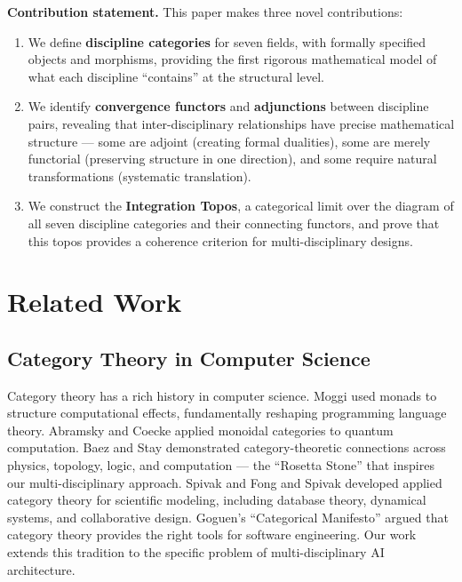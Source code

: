 \documentclass[11pt,a4paper]{article}
\begin{document}
\textbf{Contribution statement.} This paper makes three novel contributions:
\begin{enumerate}[label=\arabic*.]
    \item We define \textbf{discipline categories} for seven fields, with formally specified objects and morphisms, providing the first rigorous mathematical model of what each discipline ``contains'' at the structural level.
    \item We identify \textbf{convergence functors} and \textbf{adjunctions} between discipline pairs, revealing that inter-disciplinary relationships have precise mathematical structure --- some are adjoint (creating formal dualities), some are merely functorial (preserving structure in one direction), and some require natural transformations (systematic translation).
    \item We construct the \textbf{Integration Topos}, a categorical limit over the diagram of all seven discipline categories and their connecting functors, and prove that this topos provides a coherence criterion for multi-disciplinary designs.
\end{enumerate}

\section{Related Work}

\subsection{Category Theory in Computer Science}

Category theory has a rich history in computer science. Moggi \cite{moggi1991} used monads to structure computational effects, fundamentally reshaping programming language theory. Abramsky and Coecke \cite{abramsky2004} applied monoidal categories to quantum computation. Baez and Stay \cite{baez2011} demonstrated category-theoretic connections across physics, topology, logic, and computation --- the ``Rosetta Stone'' that inspires our multi-disciplinary approach. Spivak \cite{spivak2014} and Fong and Spivak \cite{fong2019} developed applied category theory for scientific modeling, including database theory, dynamical systems, and collaborative design. Goguen's ``Categorical Manifesto'' \cite{goguen1991} argued that category theory provides the right tools for software engineering. Our work extends this tradition to the specific problem of multi-disciplinary AI architecture.
\end{document}
